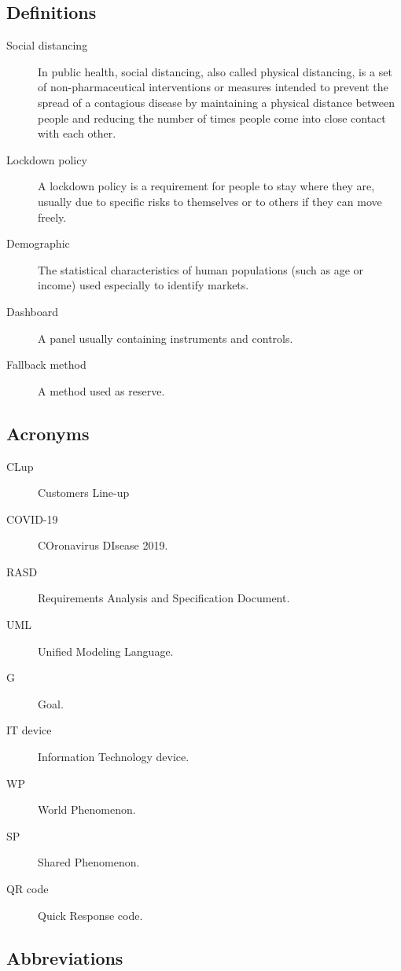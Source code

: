 \documentclass[../../main.tex]{subfiles}
\begin{document}
\subsection{Definitions}

\begin{description}

    \item[Social distancing] In public health, social distancing, also called physical distancing,
                             is a set of non-pharmaceutical interventions or measures intended to prevent the spread of a contagious disease by maintaining 
                             a physical distance between people and reducing the number of times people come into close contact with each other.

    \item[Lockdown policy] A lockdown policy is a requirement for people to stay where they are, usually due to specific risks to themselves or to others if they can move freely. 
    
    \item[Demographic] The statistical characteristics of human populations (such as age or income) used especially to identify markets.
    
    \item[Dashboard] A panel usually containing instruments and controls.
    
    \item[Fallback method] A method used as reserve.
\end{description}

\subsection{Acronyms}

\begin{description}
    
    \item[CLup] Customers Line-up
    
    \item[COVID-19] COronavirus DIsease 2019.
    
    \item[RASD] Requirements Analysis and Specification Document.
    
    \item[UML] Unified Modeling Language.
    
    \item[G] Goal.
    
    \item[IT device] Information Technology device.
    
    \item[WP] World Phenomenon.
    
    \item[SP] Shared Phenomenon.
    
    \item[QR code] Quick Response code.
\end{description}

\subsection{Abbreviations}
\end{document}
